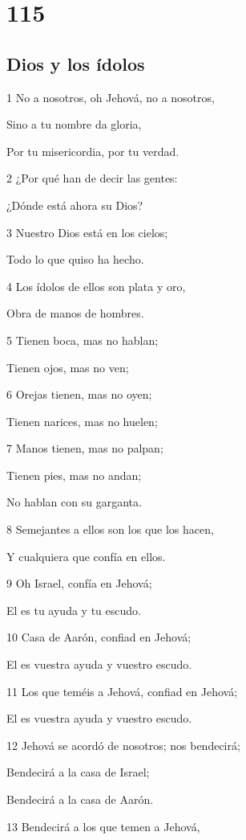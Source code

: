 \chapter{115}

\section*{Dios y los ídolos}

\par 1 No a nosotros, oh Jehová, no a nosotros,
\par Sino a tu nombre da gloria,
\par Por tu misericordia, por tu verdad.
\par 2 ¿Por qué han de decir las gentes:
\par ¿Dónde está ahora su Dios?
\par 3 Nuestro Dios está en los cielos;
\par Todo lo que quiso ha hecho.
\par 4 Los ídolos de ellos son plata y oro,
\par Obra de manos de hombres.
\par 5 Tienen boca, mas no hablan;
\par Tienen ojos, mas no ven;
\par 6 Orejas tienen, mas no oyen;
\par Tienen narices, mas no huelen;
\par 7 Manos tienen, mas no palpan;
\par Tienen pies, mas no andan;
\par No hablan con su garganta.
\par 8 Semejantes a ellos son los que los hacen,
\par Y cualquiera que confía en ellos.
\par 9 Oh Israel, confía en Jehová;
\par El es tu ayuda y tu escudo.
\par 10 Casa de Aarón, confiad en Jehová;
\par El es vuestra ayuda y vuestro escudo.
\par 11 Los que teméis a Jehová, confiad en Jehová;
\par El es vuestra ayuda y vuestro escudo.
\par 12 Jehová se acordó de nosotros; nos bendecirá;
\par Bendecirá a la casa de Israel;
\par Bendecirá a la casa de Aarón.
\par 13 Bendecirá a los que temen a Jehová,
